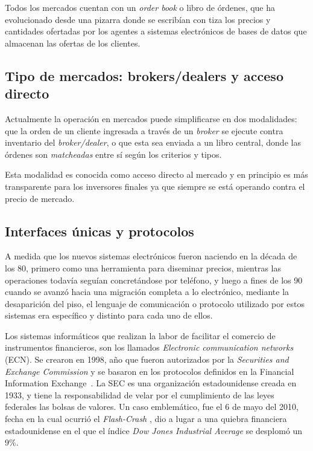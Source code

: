 Todos los mercados cuentan con un \emph{order book} o libro de órdenes, que ha
evolucionado desde una pizarra donde se escribían con tiza los precios y
cantidades ofertadas por los agentes a sistemas electrónicos de bases de datos
que almacenan las ofertas de los clientes.


\subsection{Tipo de mercados: brokers/dealers y acceso directo}

Actualmente la operación en mercados puede simplificarse en dos modalidades:
que la orden de un cliente ingresada a través de un \emph{broker} se ejecute
contra inventario del \emph{broker/dealer}, o que esta sea enviada a un libro
central, donde las órdenes son \emph{matcheadas} entre sí según los criterios y
tipos.

Esta modalidad es conocida como acceso directo al mercado y en principio es más 
transparente para los inversores finales ya que siempre se está operando contra 
el precio de mercado.


\subsection{Interfaces únicas y protocolos}
A medida que los nuevos sistemas electrónicos fueron naciendo en la década de
los 80, primero como una herramienta para diseminar precios, mientras las
operaciones todavía seguían concretándose por teléfono, y luego a fines de los
90 cuando se avanzó hacia una migración completa a lo electrónico, mediante la
desaparición del piso, el lenguaje de comunicación o protocolo utilizado por
estos sistemas era específico y distinto para cada uno de ellos.

Los sistemas informáticos que realizan la labor de facilitar el comercio de
instrumentos financieros, son los llamados \emph{Electronic communication
networks} (ECN).  Se crearon en 1998, año que fueron autorizados por la
\emph{Securities and Exchange Commission} y se basaron en los protocolos
definidos en la Financial Information Exchange~\cite{mcandrews2000emergence}.
La SEC \cite{hasbrouck2004economic} es una organización estadounidense creada
en 1933, y tiene la responsabilidad de velar por el cumplimiento de las leyes
federales las bolsas de valores. Un caso emblemático, fue el 6 de mayo del
2010, fecha en la cual ocurrió el \emph{Flash-Crash} \cite{arndt2011high}, dio
a lugar a una quiebra financiera estadounidense en el que el índice \emph{Dow
Jones Industrial Average} se desplomó un 9\%. 

